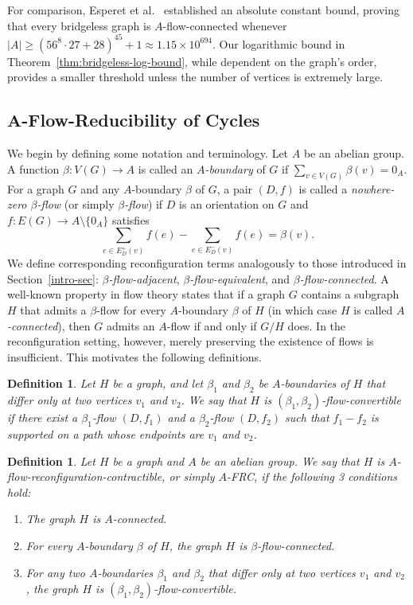 \documentclass[a4paper,12pt]{article}
\theoremstyle{plain}
\newtheorem{definition}[theorem]{Definition}
\theoremstyle{definition}
\renewcommand\ge\geqslant
\begin{document}
For comparison, Esperet et al.~\cite{esperet-et-al} established an absolute constant bound, proving that every bridgeless graph is $A$-flow-connected whenever $|A| \ge (56^8\cdot 27+28)^{45}+1 \approx 1.15 \times 10^{694}$. Our logarithmic bound in Theorem~\ref{thm:bridgeless-log-bound}, while dependent on the graph's order, provides a smaller threshold unless the number of vertices is extremely large.


\subsection{\texorpdfstring{$\bm{A}$}{A}-Flow-Reducibility of Cycles}
\label{sec4.2}
We begin by defining some notation and terminology.
Let $A$ be an abelian group. A function $\beta:V(G)\to A$ is called an \emph{$A$-boundary} of $G$ if $\sum_{v\in V(G)} \beta(v)=0_A.$
For a graph $G$ and any $A$-boundary $\beta$ of $G$, a pair $(D, f)$ is called a \emph{nowhere-zero $\beta$-flow} (or simply \emph{$\beta$-flow}) if $D$ is an orientation on $G$ and $f:E(G)\to A\setminus\{0_A\}$ satisfies $$
\sum_{e\in E_D^+(v)} f(e)-\sum_{e\in E_D^-(v)} f(e)=\beta(v).$$
We define corresponding reconfiguration terms analogously to those introduced in
Section~\ref{intro-sec}: \emph{$\beta$-flow-adjacent}, \emph{$\beta$-flow-equivalent}, and \emph{$\beta$-flow-connected}.
A well-known property in flow theory states that if a graph $G$ contains a subgraph $H$ that admits a $\beta$-flow for every $A$-boundary $\beta$ of $H$ (in which case $H$ is called \emph{$A$-connected}), then $G$ admits an $A$-flow if and only if $G/H$ does. In the reconfiguration setting, however, merely preserving the existence of flows is insufficient. This motivates the following definitions.

\begin{definition}
Let $H$ be a graph, and let $\beta_1$ and $\beta_2$ be $A$-boundaries of $H$ that differ only at two vertices $v_1$ and $v_2$. We say that $H$ is \emph{$(\beta_1,\beta_2)$-flow-convertible} if there exist a $\beta_1$-flow $(D,f_1)$ and a $\beta_2$-flow $(D,f_2)$ such that $f_1-f_2$ is supported on a path whose endpoints are $v_1$ and $v_2$.
\end{definition}

\begin{definition}
\label{$A$-FRC-def}
Let $H$ be a graph and $A$ be an abelian group.
We say that $H$ is \emph{$A$-flow-reconfiguration-contractible}, or simply \emph{$A$-FRC}, if the following 3 conditions hold:
\begin{enumerate}[label=(\roman*)]
\item\label{FRC-1}
The graph $H$ is $A$-connected.
\item\label{FRC-2}
For every $A$-boundary $\beta$ of $H$, the graph $H$ is $\beta$-flow-connected.
\item\label{FRC-3}
For any two $A$-boundaries $\beta_1$ and $\beta_2$ that differ only at two vertices $v_1$ and $v_2$, the graph $H$ is $(\beta_1,\beta_2)$-flow-convertible.
\end{enumerate}
\end{definition}
\end{document}
